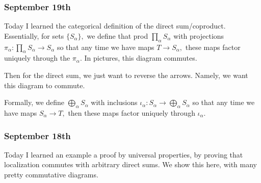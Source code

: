 \subsubsection{September 19th}
Today I learned the categorical definition of the direct sum/coproduct. Essentially, for sets $\{S_\alpha\},$ we define that prod $\prod_\alpha S_\alpha$ with projections $\pi_\alpha:\prod_\alpha S_\alpha\to S_\alpha$ so that any time we have maps $T\to S_\alpha,$ these maps factor uniquely through the $\pi_\alpha.$ In pictures, this diagram commutes.
\begin{center}
\end{center}
Then for the direct sum, we just want to reverse the arrows. Namely, we want this diagram to commute.
\begin{center}
\end{center}
Formally, we define $\bigoplus_\alpha S_\alpha$ with inclusions $\iota_\alpha:S_\alpha\to\bigoplus_\alpha S_\alpha$ so that any time we have maps $S_\alpha\to T,$ then these maps factor uniquely through $\iota_\alpha.$

\subsubsection{September 18th}
Today I learned an example a proof by universal properties, by proving that localization commutes with arbitrary direct sums. We show this here, with many pretty commutative diagrams.

